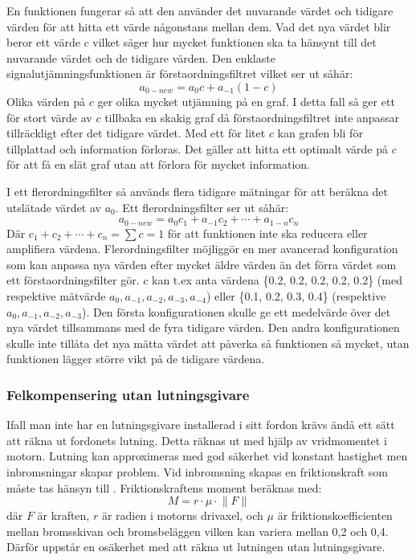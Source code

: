 En funktionen fungerar så att den använder det nuvarande värdet och
tidigare värden för att hitta ett värde någonstans mellan dem. Vad det
nya värdet blir beror ett värde $c$ vilket säger hur mycket funktionen ska
ta hänsynt till det nuvarande värdet och de tidigare värden. Den enklaste
signalutjämningsfunktionen är förstaordningsfiltret vilket ser ut såhär:
\begin{equation}
	a_{0-new} = a_{0}c + a_{-1}(1 - c)
\end{equation}
Olika värden på $c$ ger olika mycket utjämning på en graf.
I detta fall så ger ett för stort värde av $c$ tillbaka en skakig graf
då förstaordningsfiltret inte anpassar tillräckligt efter det tidigare värdet.
Med ett för litet $c$ kan grafen bli för tillplattad och information förloras.
Det gäller att hitta ett optimalt värde på $c$ för att få en slät graf
utan att förlora för mycket information.

I ett flerordningsfilter så används flera tidigare mätningar för att
beräkna det utslätade värdet av $a_{0}$. Ett flerordningsfilter ser ut såhär:
\begin{equation}
	a_{0-new} = a_{0}c_{1} + a_{-1}c_{2} + \dotsb + a_{1-n}c_{n}
\end{equation}
Där $ c_1 + c_2 + \dotsb + c_n = \sum c = 1 $ för att funktionen
inte ska reducera eller amplifiera värdena.
Flerordningsfilter möjliggör en mer avancerad konfiguration som kan anpassa
nya värden efter mycket äldre värden än det förra värdet som ett
förstaordningsfilter gör.
$c$ kan t.ex anta värdena \{0.2, 0.2, 0.2, 0.2, 0.2\} (med respektive mätvärde
$a_0, a_{-1}, a_{-2}, a_{-3}, a_{-4}$) eller \{0.1, 0.2, 0.3, 0.4\}
(respektive $ a_0, a_{-1}, a_{-2}, a_{-3}$).
Den första konfigurationen skulle ge ett medelvärde över det nya värdet
tillsammans med de fyra tidigare värden. Den andra konfigurationen skulle
inte tillåta det nya mätta värdet att påverka så funktionen så mycket,
utan funktionen lägger större vikt på de tidigare värdena.

\subsubsection{Felkompensering utan lutningsgivare}
Ifall man inte har en lutningsgivare installerad i sitt fordon krävs ändå ett
sätt att räkna ut fordonets lutning.
Detta räknas ut med hjälp av vridmomentet i motorn.
Lutning kan approximeras med god säkerhet vid konstant hastighet men inbromsningar
skapar problem.
Vid inbromsning skapas en friktionskraft som måste tas hänsyn till .
Friktionskraftens moment beräknas med:
\begin{equation}
	M = r \cdot \mu \cdot \lVert F \rVert
\end{equation}
där $F$ är kraften, $r$ är radien i motorns drivaxel, och $\mu$ är friktionskoefficienten
mellan bromsskivan och bromsbeläggen vilken kan variera mellan 0,2 och 0,4.
Därför uppstår en osäkerhet med att räkna ut lutningen utan lutningsgivare.
\autocite{lauri17}

